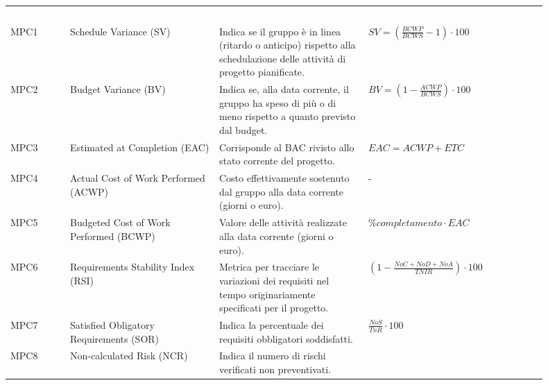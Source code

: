 \setlength\extrarowheight{5pt}
\newpage
\begin{longtable}{P{0.1\linewidth}P{0.25\linewidth}P{0.25\linewidth}P{0.30\linewidth}}
        \textcolor{white}{\textbf{Codice}}
        & \textcolor{white}{\textbf{Nome}}
        & \textcolor{white}{\textbf{Descrizione}}
		& \textcolor{white}{\textbf{Formula}}\\[4pt]
	    MPC1 
        & Schedule Variance (SV) 
        & Indica se il gruppo è in linea (ritardo o anticipo) rispetto alla schedulazione delle attività di progetto pianificate.
        & $SV = (\frac{BCWP}{BCWS} - 1) \cdot 100$ \\[4pt]
            MPC2 
            & Budget Variance (BV) 
            & Indica se, alla data corrente, il gruppo ha speso di più o di meno rispetto a quanto previsto dal budget.
            & $BV = (1 - \frac{ACWP}{BCWS}) \cdot 100$	\\[4pt]
	    	MPC3 
            & Estimated at Completion (EAC) 
            & Corrisponde al BAC rivisto allo stato corrente del progetto.
            & $EAC = ACWP + ETC$	\\[4pt]
            MPC4 
            & Actual Cost of Work Performed (ACWP) 
            & Costo effettivamente sostenuto dal gruppo alla data corrente (giorni o euro).
            & -		\\[4pt]
	    	MPC5 
            & Budgeted Cost of Work Performed (BCWP) 
            & Valore delle attività realizzate alla data corrente (giorni o euro). 
            & $\%completamento \cdot EAC$		\\[4pt]
            MPC6 
            & Requirements Stability Index (RSI) 
            & Metrica per tracciare le variazioni dei requisiti nel tempo originariamente specificati per il progetto.  
            & $(1-\frac{NoC + NoD + NoA}{TNIR}) \cdot 100$	\\[4pt]
	    	MPC7 
            & Satisfied Obligatory Requirements (SOR) 
            & Indica la percentuale dei requisiti obbligatori soddisfatti. 
            & $\frac{NoS}{TnR} \cdot 100$		\\[4pt]
            MPC8 
            & Non-calculated Risk (NCR) 
            & Indica il numero di rischi verificati non preventivati. 

\end{longtable}
